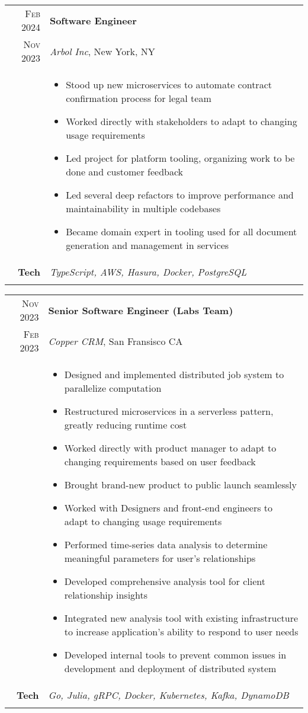 \documentclass[a4paper,10pt]{article}
\newcommand{\br}{\\\multicolumn{2}{c}{}}
\begin{document}
\begin{tabular}{r|p{15cm}}
  \textsc{Feb 2024}  & \textbf{Software Engineer} \\
  \textsc{Nov 2023} & \textit{Arbol Inc}, New York, NY
  \\ &  
       \begin{itemize}
       \item Stood up new microservices to automate contract confirmation process for legal team
       \item Worked directly with stakeholders to adapt to changing usage requirements
       \item Led project for platform tooling, organizing work to be done and customer feedback
       \item Led several deep refactors to improve performance and maintainability in multiple codebases
       \item Became domain expert in tooling used for all document generation and management in services
       \end{itemize} \\
  \textbf{Tech} & \textit{TypeScript, AWS, Hasura, Docker, PostgreSQL} \br \\
\end{tabular}

\begin{tabular}{r|p{15cm}}
  \textsc{Nov 2023}  & \textbf{Senior Software Engineer (Labs Team)} \\
  \textsc{Feb 2023} & \textit{Copper CRM}, San Fransisco CA
  \\ &  
       \begin{itemize}
       \item Designed and implemented distributed job system to parallelize computation
       \item Restructured microservices in a serverless pattern, greatly reducing runtime cost
       \item Worked directly with product manager to adapt to changing requirements based on user feedback
       \item Brought brand-new product to public launch seamlessly
       \item Worked with Designers and front-end engineers to adapt to changing usage requirements
       \item Performed time-series data analysis to determine meaningful parameters for user's relationships
       \item Developed comprehensive analysis tool for client relationship insights
       \item Integrated new analysis tool with existing infrastructure to increase application's ability to respond to user needs
       \item Developed internal tools to prevent common issues in development and deployment of distributed system
       \end{itemize} \\
  \textbf{Tech} & \textit{Go, Julia, gRPC, Docker, Kubernetes, Kafka, DynamoDB} \br \\
\end{tabular}
\end{document}
